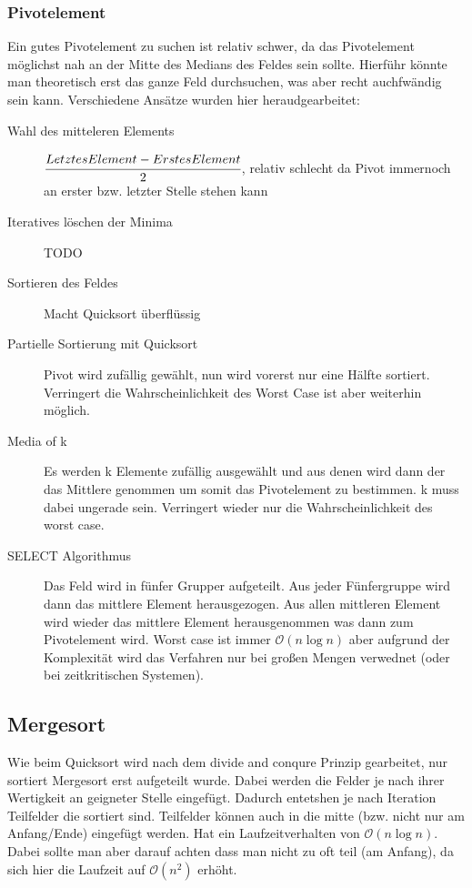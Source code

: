 \documentclass[a4paper]{scrartcl}
\begin{document}
            \subsubsection{Pivotelement}
            Ein gutes Pivotelement zu suchen ist relativ schwer, da  das Pivotelement möglichst nah an der Mitte des Medians des Feldes sein sollte. Hierführ könnte
            man theoretisch erst das ganze Feld durchsuchen, was aber recht auchfwändig sein kann. Verschiedene Ansätze wurden hier heraudgearbeitet:
            \begin{description}
                \item[Wahl des mitteleren Elements] \(\cfrac{Letztes Element - Erstes Element}{2}\), relativ schlecht da Pivot immernoch an erster bzw. letzter Stelle stehen kann
                \item[Iteratives löschen der Minima] TODO
                \item[Sortieren des Feldes] Macht Quicksort überflüssig
                \item[Partielle Sortierung mit Quicksort] Pivot wird zufällig gewählt, nun wird vorerst nur eine Hälfte sortiert. Verringert die Wahrscheinlichkeit des Worst Case
                    ist aber weiterhin möglich.
                \item[Media of k] Es werden k Elemente zufällig ausgewählt und aus denen wird dann der das Mittlere genommen um somit das Pivotelement zu bestimmen.
                k muss dabei ungerade sein. Verringert wieder nur die Wahrscheinlichkeit des worst case.
                \item[SELECT Algorithmus] Das Feld wird in fünfer Grupper aufgeteilt. Aus jeder Fünfergruppe wird dann das mittlere Element herausgezogen. Aus allen 
                mittleren Element wird wieder das mittlere Element herausgenommen was dann zum Pivotelement wird. Worst case ist immer \(\mathcal{O}(n \log n)\) aber
                aufgrund der Komplexität wird das Verfahren nur bei großen Mengen verwednet (oder bei zeitkritischen Systemen).
            \end{description} 

        \subsection{Mergesort}
            Wie beim Quicksort wird nach dem divide and conqure Prinzip gearbeitet, nur sortiert Mergesort erst aufgeteilt wurde. Dabei werden die Felder je nach 
            ihrer Wertigkeit an geigneter Stelle eingefügt. Dadurch entetshen je nach Iteration Teilfelder die sortiert sind. Teilfelder können auch 
            in die mitte (bzw. nicht nur am Anfang/Ende) eingefügt werden. Hat ein Laufzeitverhalten von \(\mathcal{O}(n \log n)\). Dabei sollte man 
            aber darauf achten dass man nicht zu oft teil (am Anfang), da sich hier die Laufzeit auf \(\mathcal{O}(n^2)\) erhöht.
\end{document}

